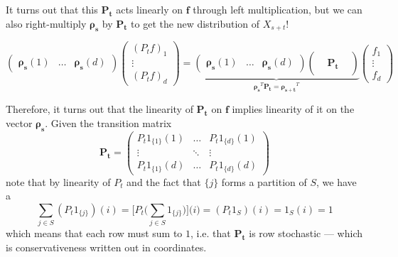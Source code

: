\begin{example}
		It turns out that this $\mathbf{P_t}$ acts linearly on $\mathbf{f}$ through left multiplication, but we can also right-multiply $\boldsymbol{\rho_s}$ by $\mathbf{P_t}$ to get the new distribution of $X_{s + t}$! 

			\begin{equation}
				\begin{pmatrix} \boldsymbol{\rho_s} (1) & \ldots & \boldsymbol{\rho_s} (d) \end{pmatrix} \begin{pmatrix} (P_t f)_1 \\ \vdots \\(P_t f)_d \end{pmatrix} = \underbrace{\begin{pmatrix} \boldsymbol{\rho_s} (1) & \ldots & \boldsymbol{\rho_s} (d) \end{pmatrix} \begin{pmatrix} && \\ & \mathbf{P_t} & \\ && \end{pmatrix}}_{\boldsymbol{\rho_s}^T \mathbf{P_t} = \boldsymbol{\rho_{s + t}}^T} \begin{pmatrix} f_1 \\ \vdots \\ f_d \end{pmatrix}
			\end{equation}

		Therefore, it turns out that the linearity of $\mathbf{P_t}$ on $\mathbf{f}$ implies linearity of it on the vector $\boldsymbol{\rho_s}$. 
		\label{ex:transition-matrix-from-the-semigroup}
		Given the transition matrix 
		\begin{equation}
			\mathbf{P_t} = \begin{pmatrix} P_t 1_{\{1\}} (1) & \ldots & P_t 1_{\{d\}} (1) \\ \vdots & \ddots & \vdots \\ P_t 1_{\{1\}} (d) & \ldots & P_t 1_{\{d\}} (d) \end{pmatrix}
		\end{equation}
		note that by linearity of $P_t$ and the fact that $\{j\}$ forms a partition of $S$, we have a
		\begin{equation}
			\sum_{j \in S} (P_t 1_{\{j\}}) (i) = \bigg[ P_t \bigg( \sum_{j \in S} 1_{\{j\}} \bigg) \bigg] \big( i \big) = (P_t 1_S) (i) = 1_S (i) = 1
		\end{equation}
		which means that each row must sum to $1$, i.e. that $\mathbf{P_t}$ is row stochastic --- which is conservativeness written out in coordinates. 
	\end{example}

